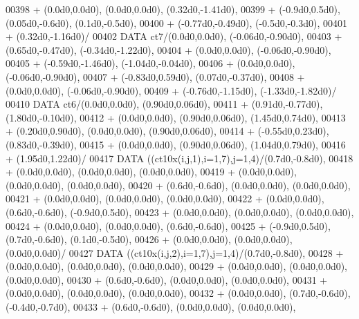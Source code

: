 \begin{DoxyCode}
00398      +                  (0.0d0,0.0d0), (0.0d0,0.0d0), (0.32d0,-1.41d0),
00399      +                  (-0.9d0,0.5d0), (0.05d0,-0.6d0), (0.1d0,-0.5d0),
00400      +                  (-0.77d0,-0.49d0), (-0.5d0,-0.3d0),
00401      +                  (0.32d0,-1.16d0)/
00402       \textcolor{keyword}{DATA}              ct7/(0.0d0,0.0d0), (-0.06d0,-0.90d0),
00403      +                  (0.65d0,-0.47d0), (-0.34d0,-1.22d0),
00404      +                  (0.0d0,0.0d0), (-0.06d0,-0.90d0),
00405      +                  (-0.59d0,-1.46d0), (-1.04d0,-0.04d0),
00406      +                  (0.0d0,0.0d0), (-0.06d0,-0.90d0),
00407      +                  (-0.83d0,0.59d0), (0.07d0,-0.37d0),
00408      +                  (0.0d0,0.0d0), (-0.06d0,-0.90d0),
00409      +                  (-0.76d0,-1.15d0), (-1.33d0,-1.82d0)/
00410       \textcolor{keyword}{DATA}              ct6/(0.0d0,0.0d0), (0.90d0,0.06d0),
00411      +                  (0.91d0,-0.77d0), (1.80d0,-0.10d0),
00412      +                  (0.0d0,0.0d0), (0.90d0,0.06d0), (1.45d0,0.74d0),
00413      +                  (0.20d0,0.90d0), (0.0d0,0.0d0), (0.90d0,0.06d0),
00414      +                  (-0.55d0,0.23d0), (0.83d0,-0.39d0),
00415      +                  (0.0d0,0.0d0), (0.90d0,0.06d0), (1.04d0,0.79d0),
00416      +                  (1.95d0,1.22d0)/
00417       \textcolor{keyword}{DATA}              ((ct10x(i,j,1),i=1,7),j=1,4)/(0.7d0,-0.8d0),
00418      +                  (0.0d0,0.0d0), (0.0d0,0.0d0), (0.0d0,0.0d0),
00419      +                  (0.0d0,0.0d0), (0.0d0,0.0d0), (0.0d0,0.0d0),
00420      +                  (0.6d0,-0.6d0), (0.0d0,0.0d0), (0.0d0,0.0d0),
00421      +                  (0.0d0,0.0d0), (0.0d0,0.0d0), (0.0d0,0.0d0),
00422      +                  (0.0d0,0.0d0), (0.6d0,-0.6d0), (-0.9d0,0.5d0),
00423      +                  (0.0d0,0.0d0), (0.0d0,0.0d0), (0.0d0,0.0d0),
00424      +                  (0.0d0,0.0d0), (0.0d0,0.0d0), (0.6d0,-0.6d0),
00425      +                  (-0.9d0,0.5d0), (0.7d0,-0.6d0), (0.1d0,-0.5d0),
00426      +                  (0.0d0,0.0d0), (0.0d0,0.0d0), (0.0d0,0.0d0)/
00427       \textcolor{keyword}{DATA}              ((ct10x(i,j,2),i=1,7),j=1,4)/(0.7d0,-0.8d0),
00428      +                  (0.0d0,0.0d0), (0.0d0,0.0d0), (0.0d0,0.0d0),
00429      +                  (0.0d0,0.0d0), (0.0d0,0.0d0), (0.0d0,0.0d0),
00430      +                  (0.6d0,-0.6d0), (0.0d0,0.0d0), (0.0d0,0.0d0),
00431      +                  (0.0d0,0.0d0), (0.0d0,0.0d0), (0.0d0,0.0d0),
00432      +                  (0.0d0,0.0d0), (0.7d0,-0.6d0), (-0.4d0,-0.7d0),
00433      +                  (0.6d0,-0.6d0), (0.0d0,0.0d0), (0.0d0,0.0d0),

\end{DoxyCode}
